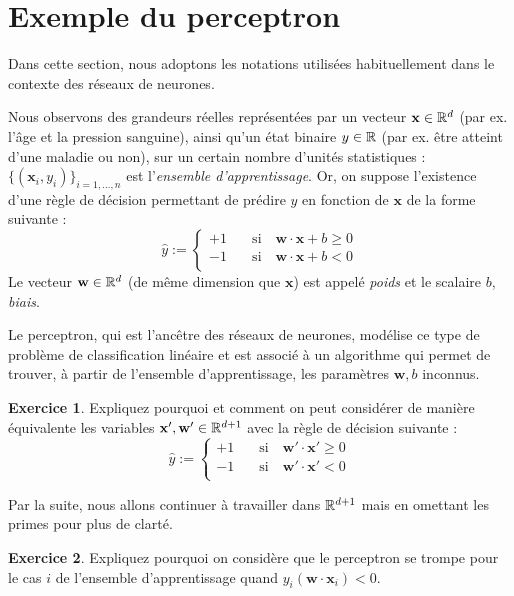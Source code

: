 \documentclass[a4paper,francais]{article}
\newcommand{\R}{{\ensuremath\mathbb{R}}}
\theoremstyle{definition}
\newtheorem{exercice}{Exercice}[section]
\begin{document}
\section{Exemple du perceptron}
\label{sec:perceptron}

\let\vec\mathbf

Dans cette section, nous adoptons les notations utilisées habituellement
dans le contexte des réseaux de neurones.

Nous observons des grandeurs réelles représentées par un vecteur $\vec{x} \in \R^d$
(par ex. l'âge et la pression sanguine), ainsi qu'un état binaire $y \in \R$
(par ex. être atteint d'une maladie ou non), sur un certain nombre d'unités
statistiques : $\{(\vec{x}_i,y_i)\}_{i = 1,\dots, n}$ est l'\emph{ensemble d'apprentissage}.
Or, on suppose l'existence d'une règle de décision permettant de prédire $y$
en fonction de $\vec{x}$ de la forme suivante :
\[
\hat{y} :=
\left\{
\begin{array}{ll}
  +1 & \quad \mathrm{si}\quad \vec{w}\cdot\vec{x} + b \geq 0 \\
  -1 & \quad \mathrm{si}\quad \vec{w}\cdot\vec{x} + b < 0 \\
\end{array}
\right.
\]
Le vecteur $\vec{w} \in \R^d$ (de même dimension que $\vec{x}$)
est appelé \emph{poids} et le scalaire $b$, \emph{biais}.

Le perceptron, qui est l'ancêtre des réseaux de neurones, modélise ce type
de problème de classification linéaire et est associé à un algorithme qui
permet de trouver, à partir de l'ensemble d'apprentissage, les paramètres
$\vec{w},b$ inconnus. 

\begin{exercice}
  Expliquez pourquoi et comment on peut considérer de manière équivalente
  les variables $\vec{x}', \vec{w}' \in \R^{d+1}$ avec la règle de décision
  suivante :
  \[
  \hat{y} :=
  \left\{
  \begin{array}{ll}
    +1 & \quad \mathrm{si}\quad \vec{w}'\cdot\vec{x}' \geq 0 \\
    -1 & \quad \mathrm{si}\quad \vec{w}'\cdot\vec{x}' < 0 \\
  \end{array}
  \right.
  \]
\end{exercice}

Par la suite, nous allons continuer à travailler dans $\R^{d+1}$ mais en
omettant les primes pour plus de clarté. 

\begin{exercice}
  Expliquez pourquoi on considère que le perceptron se trompe pour le cas $i$
  de l'ensemble d'apprentissage quand $y_i (\vec{w}\cdot\vec{x}_i) < 0$.
\end{exercice}
\end{document}
